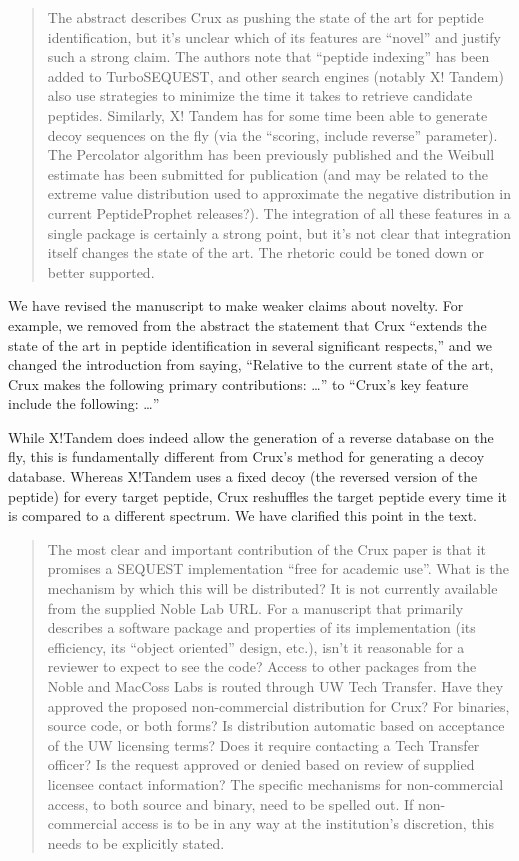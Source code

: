 \documentclass{article}
\newcommand{\breview}{\begin{quotation}\begin{em}\noindent}
\newcommand{\ereview}{\end{em}\end{quotation}}
\begin{document}
\breview The abstract describes Crux as pushing the state of the art
for peptide identification, but it's unclear which of its features are
``novel'' and justify such a strong claim. The authors note that
``peptide indexing'' has been added to TurboSEQUEST, and other search
engines (notably X! Tandem) also use strategies to minimize the time
it takes to retrieve candidate peptides. Similarly, X! Tandem has for
some time been able to generate decoy sequences on the fly (via the
``scoring, include reverse'' parameter). The Percolator algorithm has
been previously published and the Weibull estimate has been submitted
for publication (and may be related to the extreme value distribution
used to approximate the negative distribution in current
PeptideProphet releases?). The integration of all these features in a
single package is certainly a strong point, but it's not clear that
integration itself changes the state of the art. The rhetoric could be
toned down or better supported. \ereview

We have revised the manuscript to make weaker claims about novelty.
For example, we removed from the abstract the statement that Crux
``extends the state of the art in peptide identification in several
significant respects,'' and we changed the introduction from saying,
``Relative to the current state of the art, Crux makes the following
primary contributions: \dots'' to ``Crux's key feature include the
following: \dots''

While X!Tandem does indeed allow the generation of a reverse database
on the fly, this is fundamentally different from Crux's method for
generating a decoy database.  Whereas X!Tandem uses a fixed decoy (the
reversed version of the peptide) for every target peptide, Crux
reshuffles the target peptide every time it is compared to a different
spectrum.  We have clarified this point in the text.

\breview The most clear and important contribution of the Crux paper
is that it promises a SEQUEST implementation ``free for academic
use''. What is the mechanism by which this will be distributed? It is
not currently available from the supplied Noble Lab URL. For a
manuscript that primarily describes a software package and properties
of its implementation (its efficiency, its ``object oriented'' design,
etc.), isn't it reasonable for a reviewer to expect to see the code?
Access to other packages from the Noble and MacCoss Labs is routed
through UW Tech Transfer. Have they approved the proposed
non-commercial distribution for Crux? For binaries, source code, or
both forms? Is distribution automatic based on acceptance of the UW
licensing terms? Does it require contacting a Tech Transfer officer?
Is the request approved or denied based on review of supplied licensee
contact information? The specific mechanisms for non-commercial
access, to both source and binary, need to be spelled out. If
non-commercial access is to be in any way at the institution's
discretion, this needs to be explicitly stated. \ereview
\end{document}
